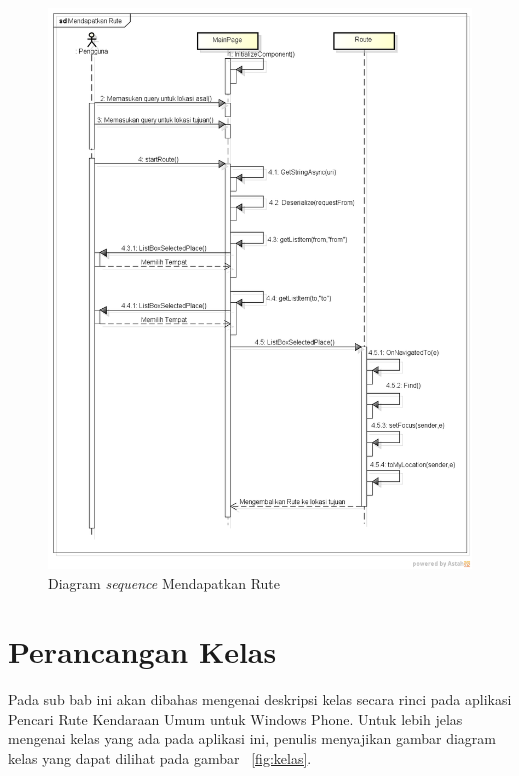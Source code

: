 \begin{figure}[h]
	\centering
		\includegraphics[scale=0.5]{Gambar/sequence/MendapatkanRute}
	\caption{Diagram \textit{sequence} Mendapatkan Rute}
	\label{fig:sequence rute}
\end{figure}


\newpage

\section{Perancangan Kelas}
\label{lab:Perancangan Kelas}
\hspace{0.5cm} Pada sub bab ini akan dibahas mengenai deskripsi kelas secara rinci pada aplikasi Pencari Rute Kendaraan Umum untuk Windows Phone. Untuk lebih jelas mengenai kelas yang ada pada aplikasi ini, penulis menyajikan gambar diagram kelas yang dapat dilihat pada  gambar ~\ref{fig:kelas}. 

